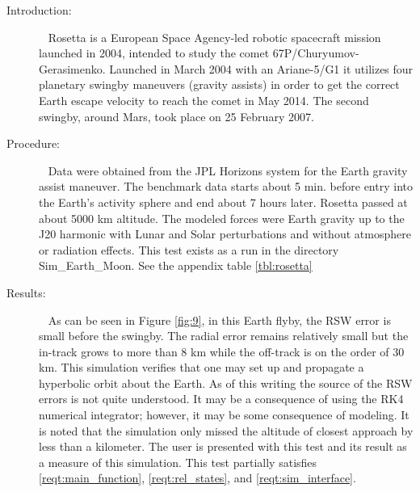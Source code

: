 \label{test:rosetta}
\begin{description}
\item[Introduction:] \ \newline
Rosetta is a European Space Agency-led robotic spacecraft mission launched in 2004,
intended to study the comet 67P/Churyumov-Gerasimenko. Launched in March 2004 with
an Ariane-5/G1 it utilizes four planetary swingby maneuvers (gravity assists) in order
to get the correct Earth escape velocity to reach the comet in May 2014.  The second
swingby, around Mars, took place on 25 February 2007.
\item[Procedure:]\ \newline
Data were obtained from the JPL Horizons system for the Earth gravity assist maneuver.
The benchmark data starts about 5 min. before entry into the Earth's activity sphere and
end about 7 hours later. Rosetta passed at about 5000 km altitude. The modeled forces were
Earth gravity up to the J20 harmonic with Lunar and Solar perturbations and without atmosphere
or radiation effects. This test exists as a run in the directory Sim\_Earth\_Moon. See the
appendix table \ref{tbl:rosetta}
\item[Results:]\ \newline
As can be seen in Figure \ref{fig:9}, in this Earth flyby, the RSW error is small before
the swingby. The radial error remains relatively small but the in-track grows to more than
8 km while the off-track is on the order of 30 km. This simulation verifies that one may set
up and propagate a hyperbolic orbit about the Earth. As of this writing the source of the
RSW errors is not quite understood.  It may be a consequence of using the RK4 numerical
integrator; however, it may be some consequence of modeling. It is noted that the simulation
only missed the altitude of closest approach by less than a kilometer. The user is presented
with this test and its result as a measure of this simulation.  This test partially satisfies
\ref{reqt:main_function}, \ref{reqt:rel_states}, and \ref{reqt:sim_interface}.



\end{description}

